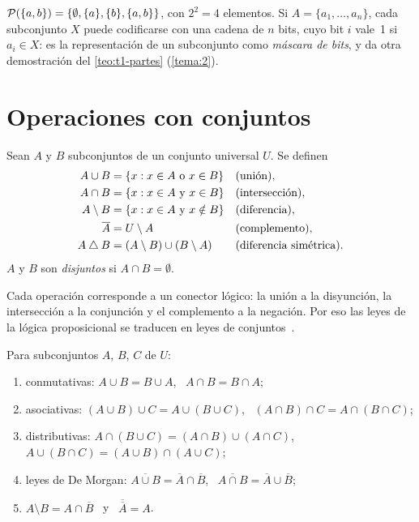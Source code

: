 \begin{ejemplo}
$\mathcal{P}(\{a,b\})=\{\emptyset,\{a\},\{b\},\{a,b\}\}$, con $2^{2}=4$ elementos. Si $A=\{a_1,\dots,a_n\}$, cada subconjunto $X$ puede codificarse con una cadena de $n$ bits, cuyo bit $i$ vale~1 si $a_i\in X$: es la representación de un subconjunto como \emph{máscara de bits}, y da otra demostración del \cref{teo:t1-partes} (\cref{tema:2}).
\end{ejemplo}

\section{Operaciones con conjuntos}

\begin{definicion}[Operaciones]
Sean $A$ y $B$ subconjuntos de un conjunto universal $U$. Se definen
\begin{align*}
A\cup B&=\{x : x\in A\ \text{o}\ x\in B\} &&\text{(unión)},\\
A\cap B&=\{x : x\in A\ \text{y}\ x\in B\} &&\text{(intersección)},\\
A\setminus B&=\{x : x\in A\ \text{y}\ x\notin B\} &&\text{(diferencia)},\\
\overline{A}&=U\setminus A &&\text{(complemento)},\\
A\mathbin{\triangle} B&=(A\setminus B)\cup(B\setminus A) &&\text{(diferencia simétrica)}.
\end{align*}
$A$ y $B$ son \emph{disjuntos} si $A\cap B=\emptyset$.
\end{definicion}

Cada operación corresponde a un conector lógico: la unión a la disyunción, la intersección a la conjunción y el complemento a la negación. Por eso las leyes de la lógica proposicional se traducen en leyes de conjuntos~\cite[§1.4]{velleman}.

\begin{teorema}\label{teo:t1-leyes}
Para subconjuntos $A$, $B$, $C$ de $U$:
\begin{enumerate}
  \item conmutativas: $A\cup B=B\cup A$, \ $A\cap B=B\cap A$;
  \item asociativas: $(A\cup B)\cup C=A\cup(B\cup C)$, \ $(A\cap B)\cap C=A\cap(B\cap C)$;
  \item distributivas: $A\cap(B\cup C)=(A\cap B)\cup(A\cap C)$, \ $A\cup(B\cap C)=(A\cup B)\cap(A\cup C)$;
  \item leyes de De Morgan: $\overline{A\cup B}=\overline{A}\cap\overline{B}$, \ $\overline{A\cap B}=\overline{A}\cup\overline{B}$;
  \item $A\setminus B=A\cap\overline{B}$ \ y \ $\overline{\overline{A}}=A$.
\end{enumerate}
\end{teorema}

